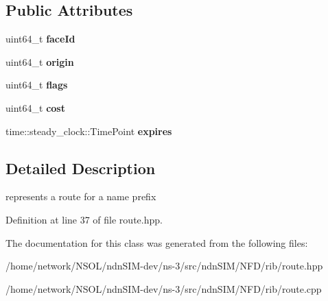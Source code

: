 \subsection*{Public Attributes}
\begin{DoxyCompactItemize}
\item 
uint64\+\_\+t {\bfseries face\+Id}\hypertarget{classnfd_1_1rib_1_1Route_ad50078c42e303f2fca57ebb3cf9ba61d}{}\label{classnfd_1_1rib_1_1Route_ad50078c42e303f2fca57ebb3cf9ba61d}

\item 
uint64\+\_\+t {\bfseries origin}\hypertarget{classnfd_1_1rib_1_1Route_a233be12824c4fea87d63431dc90bb50a}{}\label{classnfd_1_1rib_1_1Route_a233be12824c4fea87d63431dc90bb50a}

\item 
uint64\+\_\+t {\bfseries flags}\hypertarget{classnfd_1_1rib_1_1Route_a088e9d6d36a22b64d90e775399e6645b}{}\label{classnfd_1_1rib_1_1Route_a088e9d6d36a22b64d90e775399e6645b}

\item 
uint64\+\_\+t {\bfseries cost}\hypertarget{classnfd_1_1rib_1_1Route_a2422574f71f01009f9e6e6f2c00ece92}{}\label{classnfd_1_1rib_1_1Route_a2422574f71f01009f9e6e6f2c00ece92}

\item 
time\+::steady\+\_\+clock\+::\+Time\+Point {\bfseries expires}\hypertarget{classnfd_1_1rib_1_1Route_a6a1e842ad529f8e99eceeda9fd75ec93}{}\label{classnfd_1_1rib_1_1Route_a6a1e842ad529f8e99eceeda9fd75ec93}

\end{DoxyCompactItemize}


\subsection{Detailed Description}
represents a route for a name prefix 

Definition at line 37 of file route.\+hpp.



The documentation for this class was generated from the following files\+:\begin{DoxyCompactItemize}
\item 
/home/network/\+N\+S\+O\+L/ndn\+S\+I\+M-\/dev/ns-\/3/src/ndn\+S\+I\+M/\+N\+F\+D/rib/route.\+hpp\item 
/home/network/\+N\+S\+O\+L/ndn\+S\+I\+M-\/dev/ns-\/3/src/ndn\+S\+I\+M/\+N\+F\+D/rib/route.\+cpp\end{DoxyCompactItemize}
